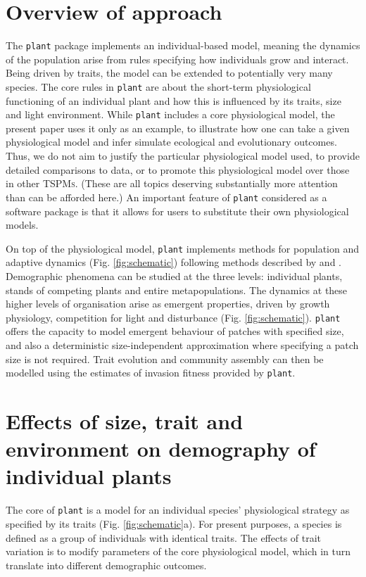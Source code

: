 \documentclass[a4paper,11pt]{article}
\newcommand{\plant}{\texttt{plant}}
\begin{document}
\section{Overview of approach}

The {\plant} package implements an individual-based model, meaning the dynamics of the
population arise from rules specifying how individuals grow and interact.
Being driven by traits, the model can be extended to potentially very many species. The
core rules in {\plant} are about the short-term physiological
functioning of an individual plant and how this is influenced by its
traits, size and light environment.  While {\plant} includes a core physiological model, the present paper uses it only as an example, to illustrate how one can take a given physiological model and infer simulate ecological and evolutionary outcomes. Thus, we do not aim to justify the particular physiological model used, to provide detailed
comparisons to data, or to promote this physiological model over those in other \textsc{TSPMs}. (These are all topics deserving substantially more attention than can be afforded here.) An important feature of {\plant} considered as a software package is that it allows for users to substitute their own physiological models.

On top of the physiological model, {\plant} implements methods for
population and adaptive dynamics (Fig.  \ref{fig:schematic}) following methods
described by \citet{Falster-2011} and \citet{Falster-2015}. Demographic
phenomena can be studied at the three levels: individual plants, stands of
competing plants and entire metapopulations. The dynamics at these higher
levels of organisation arise as emergent properties, driven by growth
physiology, competition for light and disturbance (Fig.  \ref{fig:schematic}).
{\plant} offers the capacity to model emergent behaviour of patches with
specified size, and also a deterministic size-independent approximation
where specifying a patch size is not required. Trait evolution and community
assembly can then be modelled using the estimates of invasion fitness
provided by {\plant}.

\section{Effects of size, trait and environment on demography of individual plants}

The core of {\plant} is a model for an individual species' physiological
strategy as specified by its traits (Fig. \ref{fig:schematic}a). For
present purposes, a species is defined as a group of individuals with identical
traits. The effects of trait variation is to modify parameters of the core
physiological model, which in turn translate into different demographic outcomes.
\end{document}
